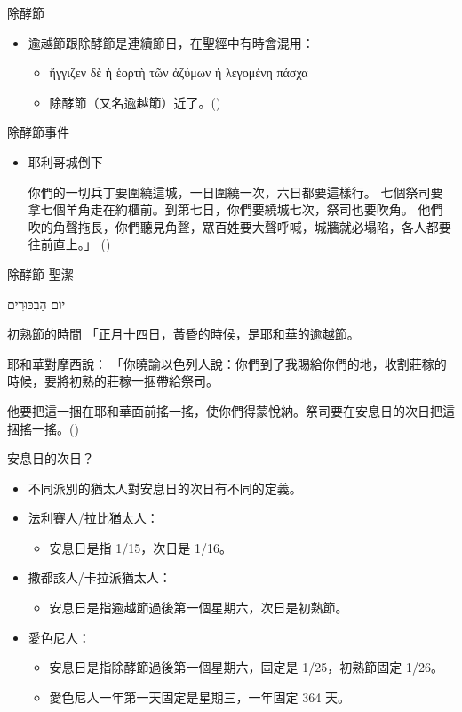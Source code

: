 \documentclass{beamer}
\newcommand{\topic}[1]{
  \begin{frame}
    \centering
    \vspace*{1cm}
    {\fontsize{40}{48}\selectfont #1\par}
    \vfill
  \end{frame}
}
\newcommand{\conclusion}[2]{
  \begin{frame}
    \centering
    \vspace*{1cm}
    {\fontsize{40}{48}\selectfont #1 \textemdash #2\par}
    \vfill
  \end{frame}
}
\newcommand{\parvspace}{\par\vspace{0.5em}}
\begin{document}
\begin{frame}{除酵節}
  \begin{itemize}
    \item 逾越節跟除酵節是連續節日，在聖經中有時會混用：
      \begin{itemize}
        \item \textgreek{ἤγγιζεν δὲ ἡ \alert{ἑορτὴ τῶν ἀζύμων} ἡ
          λεγομένη \alert{πάσχα}}\
        \item 除酵節（又名逾越節）近了。()
      \end{itemize}
  \end{itemize}
\end{frame}

\begin{frame}{除酵節事件}
  \begin{itemize}
    \item 耶利哥城倒下\par
      你們的一切兵丁要圍繞這城，一日圍繞一次，六日都要這樣行。
      七個祭司要拿七個羊角走在約櫃前。到第七日，你們要繞城七次，祭司也要吹角。
      他們吹的角聲拖長，你們聽見角聲，眾百姓要大聲呼喊，城牆就必塌陷，各人都要往前直上。」 ()
  \end{itemize}
\end{frame}

\conclusion{除酵節}{聖潔}

\topic{\texthebrew{יוֹם הַבִּכּוּרִים}}

\begin{frame}{初熟節的時間}
  「正月十四日，黃昏的時候，是耶和華的逾越節。\textellipsis{}\parvspace
  耶和華對摩西說： 「你曉諭以色列人說：你們到了我賜給你們的地，收割莊稼的時候，要將初熟的莊稼一捆帶給祭司。\parvspace
  他要把這一捆在耶和華面前搖一搖，使你們得蒙悅納。祭司要在\alert{安息日的次日}把這捆搖一搖。(\bibleref{Lv
  23:5,9-14})\parvspace
\end{frame}

\begin{frame}{安息日的次日？}
  \begin{itemize}
    \item 不同派別的猶太人對安息日的次日有不同的定義。\parencite{TruthShavuot}
    \item 法利賽人/拉比猶太人：
      \begin{itemize}
        \item 安息日是指 1/15，次日是 1/16。
      \end{itemize}
    \item 撒都該人/卡拉派猶太人：
      \begin{itemize}
        \item 安息日是指逾越節過後第一個星期六，次日是初熟節。
      \end{itemize}
    \item 愛色尼人：
      \begin{itemize}
        \item 安息日是指除酵節過後第一個星期六，固定是 1/25，初熟節固定 1/26。
        \item 愛色尼人一年第一天固定是星期三，一年固定 364 天。
      \end{itemize}
  \end{itemize}
\end{frame}
\end{document}
